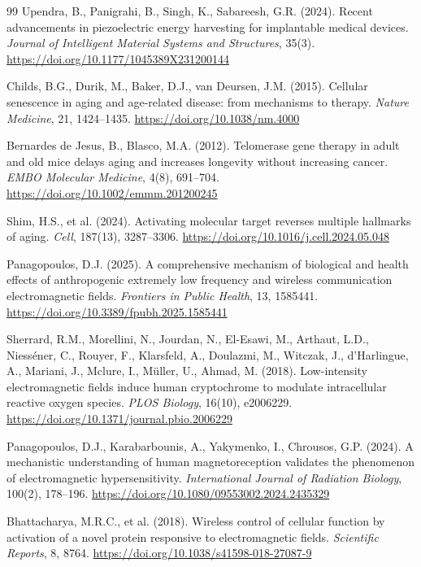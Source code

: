 \documentclass[12pt]{article}
\begin{document}
\begin{thebibliography}{99}
Upendra, B., Panigrahi, B., Singh, K., Sabareesh, G.R. (2024).
Recent advancements in piezoelectric energy harvesting for implantable medical devices.
\textit{Journal of Intelligent Material Systems and Structures}, 35(3).
\url{https://doi.org/10.1177/1045389X231200144}

Childs, B.G., Durik, M., Baker, D.J., van Deursen, J.M. (2015).
Cellular senescence in aging and age-related disease: from mechanisms to therapy.
\textit{Nature Medicine}, 21, 1424--1435.
\url{https://doi.org/10.1038/nm.4000}

Bernardes de Jesus, B., Blasco, M.A. (2012).
Telomerase gene therapy in adult and old mice delays aging and increases longevity without increasing cancer.
\textit{EMBO Molecular Medicine}, 4(8), 691--704.
\url{https://doi.org/10.1002/emmm.201200245}

Shim, H.S., et al. (2024).
Activating molecular target reverses multiple hallmarks of aging.
\textit{Cell}, 187(13), 3287--3306.
\url{https://doi.org/10.1016/j.cell.2024.05.048}

Panagopoulos, D.J. (2025).
A comprehensive mechanism of biological and health effects of anthropogenic extremely low frequency and wireless communication electromagnetic fields.
\textit{Frontiers in Public Health}, 13, 1585441.
\url{https://doi.org/10.3389/fpubh.2025.1585441}

Sherrard, R.M., Morellini, N., Jourdan, N., El-Esawi, M., Arthaut, L.D., Niess\'{e}ner, C., Rouyer, F., Klarsfeld, A., Doulazmi, M., Witczak, J., d'Harlingue, A., Mariani, J., Mclure, I., M\"{u}ller, U., Ahmad, M. (2018).
Low-intensity electromagnetic fields induce human cryptochrome to modulate intracellular reactive oxygen species.
\textit{PLOS Biology}, 16(10), e2006229.
\url{https://doi.org/10.1371/journal.pbio.2006229}

Panagopoulos, D.J., Karabarbounis, A., Yakymenko, I., Chrousos, G.P. (2024).
A mechanistic understanding of human magnetoreception validates the phenomenon of electromagnetic hypersensitivity.
\textit{International Journal of Radiation Biology}, 100(2), 178--196.
\url{https://doi.org/10.1080/09553002.2024.2435329}

Bhattacharya, M.R.C., et al. (2018).
Wireless control of cellular function by activation of a novel protein responsive to electromagnetic fields.
\textit{Scientific Reports}, 8, 8764.
\url{https://doi.org/10.1038/s41598-018-27087-9}


\end{thebibliography}
\end{document}
